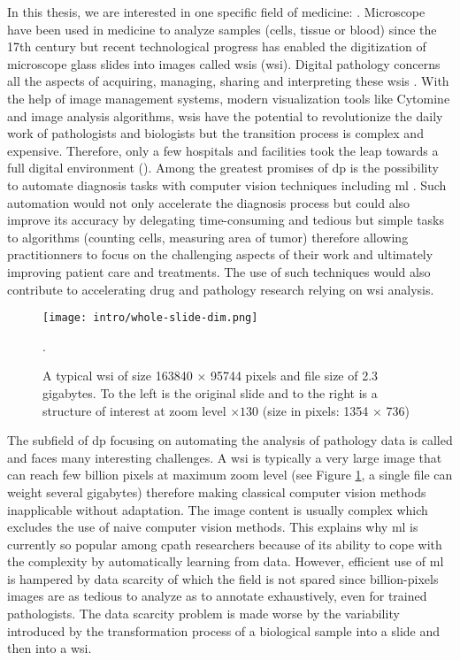 In this thesis, we are interested in one specific field of medicine: . Microscope have been used in medicine to analyze samples (\eg cells, tissue or blood) since the 17th century \parencite{hajdu2002first} but recent technological progress has enabled the digitization of microscope glass slides into images called \acrlong{wsi}s (\acrshort{wsi}). Digital pathology concerns all the aspects of acquiring, managing, sharing and interpreting these \acrshort{wsi}s \parencite{doolan2019whatisdp}. With the help of image management systems, modern visualization tools like Cytomine \parencite{maree2016collaborative} and image analysis algorithms, \acrshort{wsi}s have the potential to revolutionize the daily work of pathologists and biologists but the transition process is complex and expensive. Therefore, only a few hospitals and facilities took the leap towards a full digital environment (\eg \cite{stathonikos2013going, eloy2021digital, temprana2022digipatics}). Among the greatest promises of \acrlong{dp} is the possibility to automate diagnosis tasks with computer vision techniques including \acrlong{ml} \parencite{ciompi2021editorial}. Such automation would not only accelerate the diagnosis process but could also improve its accuracy by delegating time-consuming and tedious but simple tasks to algorithms (\eg counting cells, measuring area of tumor) therefore allowing practitionners to focus on the challenging aspects of their work and ultimately improving patient care and treatments. The use of such techniques would also contribute to accelerating drug and pathology research relying on \acrlong{wsi} analysis. 

\begin{figure}
  \centering
  \texttt{[image: intro/whole-slide-dim.png]}
  \caption{A typical \acrlong{wsi} of size 163840 $\times$ 95744 pixels and file size of 2.3 gigabytes. To the left is the original slide and to the right is a structure of interest at zoom level $\times130$ (size in pixels: 1354 $\times$ 736)}.
  \label{fig:intro:wsi}
\end{figure}

The subfield of \acrlong{dp} focusing on automating the analysis of pathology data is called  and faces many interesting challenges. A \acrshort{wsi} is typically a very large image that can reach few billion pixels at maximum zoom level (see Figure \ref{fig:intro:wsi}, a single file can weight several gigabytes) therefore making classical computer vision methods inapplicable without adaptation. The image content is usually complex which excludes the use of naive computer vision methods. This explains why \acrlong{ml} is currently so popular among \acrlong{cpath} researchers because of its ability to cope with the complexity by automatically learning from data. However, efficient use of \acrlong{ml} is hampered by data scarcity of which the field is not spared since billion-pixels images are as tedious to analyze as to annotate exhaustively, even for trained pathologists. The data scarcity problem is made worse by the variability introduced by the transformation process of a biological sample into a slide and then into a \acrlong{wsi}.

